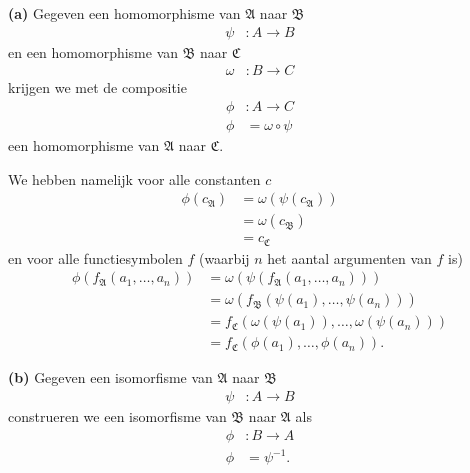 \documentclass[a4paper,11pt]{article}
\begin{document}
\begin{description}

\item{\bf (a)} %
Gegeven een homomorphisme van $\mathfrak{A}$ naar $\mathfrak{B}$
\begin{align*}
\psi &: A \rightarrow B
\end{align*}
en een homomorphisme van $\mathfrak{B}$ naar $\mathfrak{C}$
\begin{align*}
\omega &: B \rightarrow C
\end{align*}
krijgen we met de compositie
\begin{align*}
\phi &: A \rightarrow C \\
\phi &= \omega \circ \psi
\end{align*}
een homomorphisme van $\mathfrak{A}$ naar $\mathfrak{C}$.

We hebben namelijk voor alle constanten $c$
\begin{align*}
\phi(c_{\mathfrak{A}}) &= \omega(\psi(c_{\mathfrak{A}})) \\
                       &= \omega(c_{\mathfrak{B}}) \\
                       &= c_{\mathfrak{C}}
\end{align*}
en voor alle functiesymbolen $f$ (waarbij $n$ het aantal argumenten van $f$
is)
\begin{align*}
\phi(f_{\mathfrak{A}}(a_{1}, \ldots, a_{n})) &=
                                             \omega(\psi(f_{\mathfrak{A}}(a_{1},
                                             \ldots, a_{n}))) \\
                                             &=
                                             \omega(f_{\mathfrak{B}}(\psi(a_{1}),
                                             \ldots, \psi(a_{n}))) \\
                                             &=
                                             f_{\mathfrak{C}}(\omega(\psi(a_{1})),
                                             \ldots, \omega(\psi(a_{n}))) \\
                                             &=
                                             f_{\mathfrak{C}}(\phi(a_{1}),
                                             \ldots, \phi(a_{n})).
\end{align*}

\item{\bf (b)} %
Gegeven een isomorfisme van $\mathfrak{A}$ naar $\mathfrak{B}$
\begin{align*}
\psi &: A \rightarrow B
\end{align*}
construeren we een isomorfisme van $\mathfrak{B}$ naar $\mathfrak{A}$ als
\begin{align*}
\phi &: B \rightarrow A \\
\phi &= \psi^{-1}.
\end{align*}


\end{description}
\end{document}
